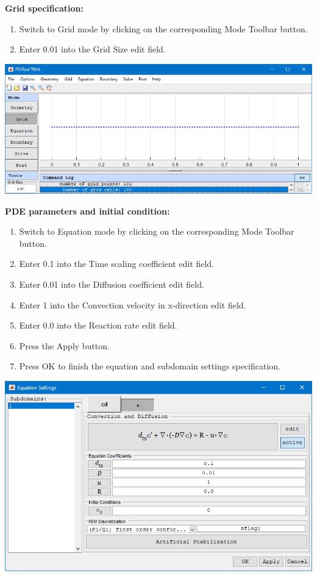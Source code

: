 \documentclass{article}
\begin{document}
\textbf{Grid specification:}
\begin{enumerate}[resume]
\item Switch to Grid mode by clicking on the corresponding Mode Toolbar button.
\item Enter  0.01  into the Grid Size edit field.
\end{enumerate}

\begin{center}
\includegraphics[scale=0.60]{./matlab/FEATool_steps/gridSpecification.png}
\end{center}

\textbf{PDE parameters and initial condition:}
\begin{enumerate}[resume]
\item Switch to Equation mode by clicking on the corresponding Mode Toolbar button.
\item Enter  0.1  into the Time scaling coefficient edit field.
\item Enter  0.01  into the Diffusion coefficient edit field.
\item Enter  1  into the Convection velocity in x-direction edit field.
\item Enter  0.0  into the Reaction rate edit field.
\item Press the Apply button.
\item Press OK to finish the equation and subdomain settings specification.
\end{enumerate}

\begin{center}
\includegraphics[scale=0.60]{./matlab/FEATool_steps/PDEparametersAndInitialCondition.png}
\end{center}
\end{document}
